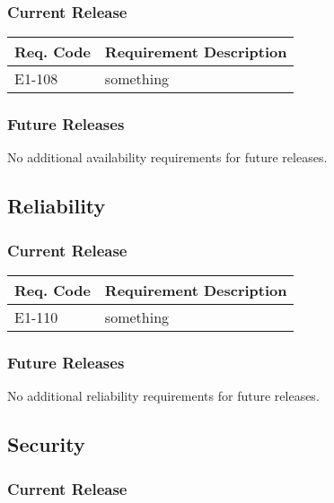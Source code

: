 \documentclass[12pt]{article}
\begin{document}
\subsubsection{Current Release}

\begin{table}[!h]
	\begin{tabular}{| l | l |}
		\hline
		\textbf{Req. Code} & \textbf{Requirement Description}\\
		\hline
		E1-108	& something\\
		\hline
	\end{tabular}
	\label{tab:AvailabilityRequirements}
\end{table}

\subsubsection{Future Releases}
No additional availability requirements for future releases.


\subsection{Reliability}

\subsubsection{Current Release}

\begin{table}[!h]
	\begin{tabular}{| l | l|}
		\hline
		\textbf{Req. Code} & \textbf{Requirement Description}\\
		\hline
		E1-110	& something\\
		\hline
	\end{tabular}
	\label{tab:ReliabilityRequirements}
\end{table}

\subsubsection{Future Releases}
No additional reliability requirements for future releases.


\subsection{Security}

\subsubsection{Current Release}
\end{document}
